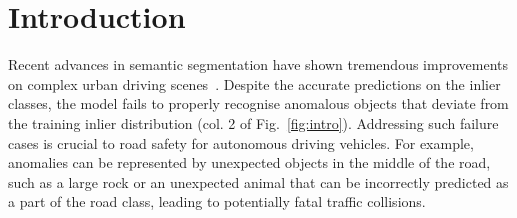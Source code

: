 \documentclass[runningheads]{llncs}
\begin{document}
\section{Introduction}
\label{sec:intro}


Recent advances in semantic segmentation have shown tremendous improvements on complex urban driving scenes~\cite{lateef2019survey,liu2022perturbed,ouali2020semi, zou2020pseudoseg, french2019semi,chen2021semi}. Despite the accurate predictions on the inlier classes, 
the model fails to properly recognise  anomalous objects that deviate from the training inlier distribution (col. 2 of Fig.~\ref{fig:intro}).
Addressing such failure cases is crucial to road safety for autonomous driving vehicles. 
For example, anomalies can be represented by unexpected objects in the middle of the road, such as
a large rock or an unexpected animal that can be incorrectly predicted as a part of the road class, leading to potentially fatal traffic collisions. 
\end{document}
